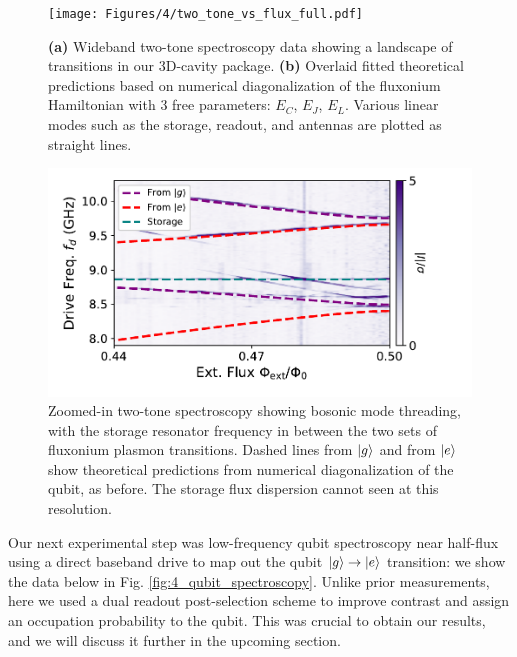 \begin{figure}[htp]
    \centering
    \texttt{[image: Figures/4/two\_tone\_vs\_flux\_full.pdf]}
    \caption{\textbf{(a)} Wideband two-tone spectroscopy data showing a landscape of transitions in our 3D-cavity package. \textbf{(b)} Overlaid fitted theoretical predictions based on numerical diagonalization of the fluxonium Hamiltonian with 3 free parameters: $E_C$, $E_J$, $E_L$. Various linear modes such as the storage, readout, and antennas are plotted as straight lines.}
\label{fig:4_two_tone_vs_flux_full}
\end{figure}
\clearpage

\begin{figure}[hp]
    \centering
    \includegraphics[width=0.8\linewidth]{Figures/4/two_tone_vs_flux_zoom.pdf}
    \caption{Zoomed-in two-tone spectroscopy showing bosonic mode threading, with the storage resonator frequency in between the two sets of fluxonium plasmon transitions. Dashed lines from $\lvert g\rangle$ and from $\lvert e\rangle$ show theoretical predictions from numerical diagonalization of the qubit, as before. The storage flux dispersion cannot seen at this resolution.}
\label{fig:4_two_tone_vs_flux_zoom}
\end{figure}

Our next experimental step was low-frequency qubit spectroscopy near half-flux using a direct baseband drive to map out the qubit  $\lvert g\rangle\to\lvert e\rangle$ transition: we show the data below in Fig. \ref{fig:4_qubit_spectroscopy}. Unlike prior measurements, here we used a dual readout post-selection scheme \cite{ding2023FTF} to improve contrast and assign an occupation probability to the qubit. This was crucial to obtain our results, and we will discuss it further in the upcoming section.

